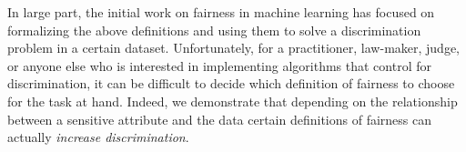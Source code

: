 In large part, the initial work on fairness in machine learning has focused on formalizing the above definitions and using them to solve a discrimination problem in a certain dataset. Unfortunately, for a practitioner, law-maker, judge, or anyone else who is interested in implementing algorithms that control for discrimination, it can be difficult to decide which definition of fairness to choose for the task at hand. Indeed, we demonstrate that depending on the relationship between a sensitive attribute and the data certain definitions of fairness can actually \emph{increase discrimination}.

% 

